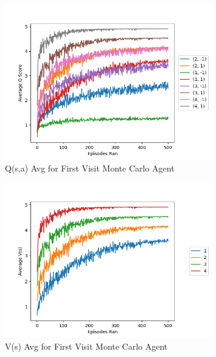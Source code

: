 \documentclass{article}
\begin{document}
\begin{figure}
    \centering
    \includegraphics[width = 0.8\textwidth]{results_first_visit_q.png}
    \caption{Q(s,a) Avg for First Visit Monte Carlo Agent}
\end{figure}

\begin{figure}
    \centering
    \includegraphics[width = 0.8\textwidth]{results_first_visit_v.png}
    \caption{V(s) Avg for First Visit Monte Carlo Agent}
\end{figure}
\end{document}
